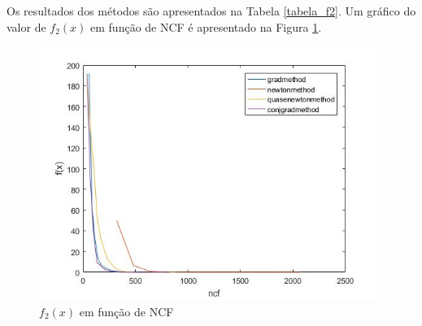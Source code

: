 \documentclass[10pt,a4paper]{article}
\begin{document}
	Os resultados dos métodos são apresentados na Tabela \ref{tabela_f2}. Um gráfico do valor de $f_2(x)$ em função de NCF é apresentado na Figura \ref{fig_f2}.

	\begin{figure}[h]
		\centering
		\includegraphics[width=11cm]{f2}
		\caption{$f_2(x)$ em função de NCF}
		\label{fig_f2}
	\end{figure}
\end{document}
